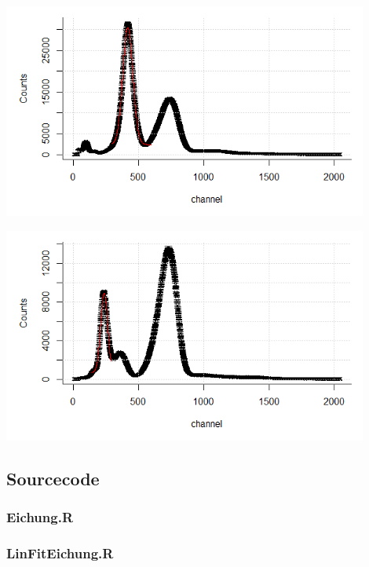\begin{minipage}{\textwidth}
	\centering
	\includegraphics[width=0.9\textwidth]{../figures/BAeichung.png}
\end{minipage}

\begin{minipage}{\textwidth}
	\centering
	\includegraphics[width=0.9\textwidth]{../figures/MoEichung.png}
\end{minipage}

\subsection{Sourcecode}
\label{code}
\subsubsection*{Eichung.R}\label{Energieeichung}


\subsubsection*{LinFitEichung.R}\label{LinFitEichung}


